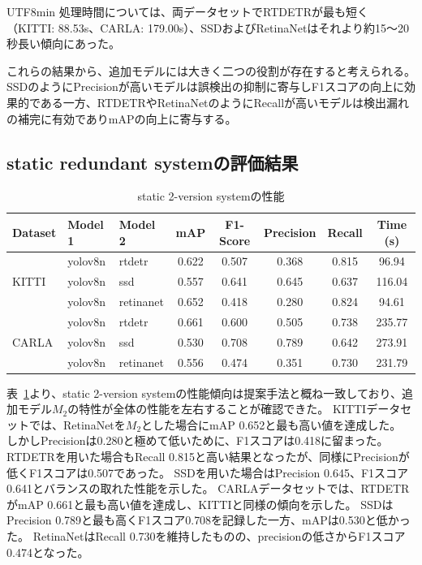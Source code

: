 \documentclass[conference, dvipdfmx]{IEEEtran}
\begin{document}
\begin{CJK}{UTF8}{min}
処理時間については、両データセットでRTDETRが最も短く（KITTI: 88.53s、CARLA: 179.00s）、SSDおよびRetinaNetはそれより約15〜20秒長い傾向にあった。

これらの結果から、追加モデルには大きく二つの役割が存在すると考えられる。SSDのようにPrecisionが高いモデルは誤検出の抑制に寄与しF1スコアの向上に効果的である一方、RTDETRやRetinaNetのようにRecallが高いモデルは検出漏れの補完に有効でありmAPの向上に寄与する。

\subsection{static redundant systemの評価結果}
\begin{table}[ht]
    \centering
    \caption{static 2-version systemの性能}
    \begin{tabular}{lllccccc}
    \toprule
    Dataset & 
    Model 1   & Model 2   & mAP   & F1-Score & Precision & Recall & Time (s) \\
    \midrule
    \multirow{3}{*}{KITTI}
    & yolov8n & rtdetr    & 0.622 & 0.507 & 0.368 & 0.815 & 96.94 \\
    & yolov8n & ssd       & 0.557 & 0.641 & 0.645 & 0.637 & 116.04 \\
    & yolov8n & retinanet & 0.652 & 0.418 & 0.280 & 0.824 & 94.61 \\
    \midrule
    \multirow{3}{*}{CARLA}
    & yolov8n & rtdetr    & 0.661 & 0.600 & 0.505 & 0.738 & 235.77 \\
    & yolov8n & ssd       & 0.530 & 0.708 & 0.789 & 0.642 & 273.91 \\
    & yolov8n & retinanet & 0.556 & 0.474 & 0.351 & 0.730 & 231.79 \\
    \bottomrule
    \end{tabular}
    \label{tab:nversion}
\end{table}
表~\ref{tab:nversion}より、static 2-version systemの性能傾向は提案手法と概ね一致しており、追加モデル$M_2$の特性が全体の性能を左右することが確認できた。
KITTIデータセットでは、RetinaNetを$M_2$とした場合にmAP 0.652と最も高い値を達成した。
しかしPrecisionは0.280と極めて低いために、F1スコアは0.418に留まった。
RTDETRを用いた場合もRecall 0.815と高い結果となったが、同様にPrecisionが低くF1スコアは0.507であった。
SSDを用いた場合はPrecision 0.645、F1スコア0.641とバランスの取れた性能を示した。
CARLAデータセットでは、RTDETRがmAP 0.661と最も高い値を達成し、KITTIと同様の傾向を示した。
SSDはPrecision 0.789と最も高くF1スコア0.708を記録した一方、mAPは0.530と低かった。
RetinaNetはRecall 0.730を維持したものの、precisionの低さからF1スコア0.474となった。


\end{CJK}
\end{document}

